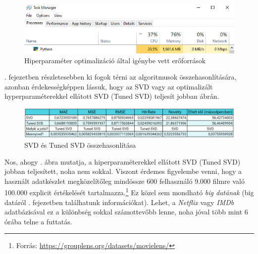 \documentclass[
]{thesis-ekf}
\theoremstyle{definition}
\theoremstyle{remark}
\begin{document}
\begin{figure}[H]
	\centering
	\includegraphics[width=14cm]{images/hyperparameter-tuning-grid-search.png}
	\caption[Hiperparaméter optimalizáció által igénybe vett erőforrások]{Hiperparaméter optimalizáció által igénybe vett erőforrások}
	\label{fig-hyperparameter-tuning-task-manager}
\end{figure}


. fejezetben részletesebben ki fogok térni az algoritmusok összehasonlítására, azonban érdekességképpen lássuk, hogy az SVD vagy az optimalizált hyperparaméterekkel ellátott SVD (Tuned SVD) teljesít jobban  ábrán.

\begin{figure}[H]
	\centering
	\includegraphics[width=14cm]{images/algoritmus-metrikak-svd-vs-tuned-svd.png}
	\caption[SVD és Tuned SVD összehasonlítása]{SVD és Tuned SVD összehasonlítása}
	\label{fig-svd-vs-tuned-svd}
\end{figure}


Nos, ahogy . ábra mutatja, a hiperparaméterekkel ellátott SVD (Tuned SVD) jobban teljesített, noha nem sokkal. Viszont érdemes figyelembe venni, hogy a használt adatkészlet megközelítőleg mindössze 600 felhasználó 9.000 filmre való 100.000 explicit értékelését tartalmazza.\footnote{Forrás: \url{https://grouplens.org/datasets/movielens/}} Ez közel sem mondható \emph{big datának} (big datáról . fejezetben találhatunk információkat). Lehet, a \emph{Netflix} vagy \emph{IMDb} adatbázisával ez a különbség sokkal számottevőbb lenne, noha jóval több mint 6 órába telne a futtatás.
\end{document}
